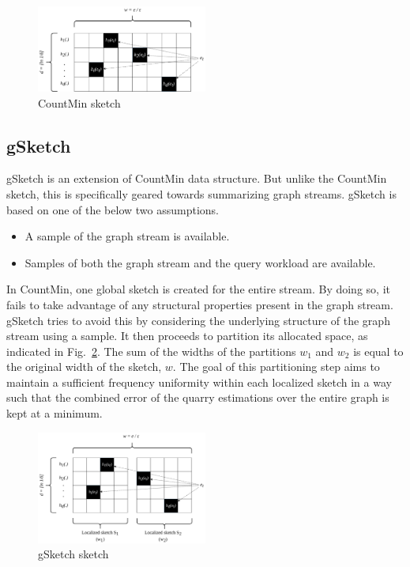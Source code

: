 \begin{figure}[htbp]
    \centerline{\includegraphics[width=0.5\textwidth]{img/countmin.png}}
    \caption{CountMin sketch\cite{zhao_gsketch:_2011}}
    \label{fig:countmin}
\end{figure}

\subsection{gSketch}

gSketch\cite{zhao_gsketch:_2011} is an extension of CountMin data structure. But unlike the CountMin sketch, this is specifically geared towards summarizing graph streams. gSketch is based on one of the below two assumptions.

\begin{itemize}
    \item A sample of the graph stream is available.
    \item Samples of both the graph stream and the query workload are available.
\end{itemize}

In CountMin, one global sketch is created for the entire stream. By doing so, it fails to take advantage of any structural properties present in the graph stream. gSketch tries to avoid this by considering the underlying structure of the graph stream using a sample. It then proceeds to partition its allocated space, as indicated in Fig.~\ref{fig:gsketch}. The sum of the widths of the partitions \(w_1\) and \(w_2\) is equal to the original width of the sketch, \(w\). The goal of this partitioning step aims to maintain a sufficient frequency uniformity within each localized sketch in a way such that the combined error of the quarry estimations over the entire graph is kept at a minimum.

\begin{figure}[htbp]
    \centerline{\includegraphics[width=0.5\textwidth]{img/gsketch.png}}
    \caption{gSketch sketch}
    \label{fig:gsketch}
\end{figure}


